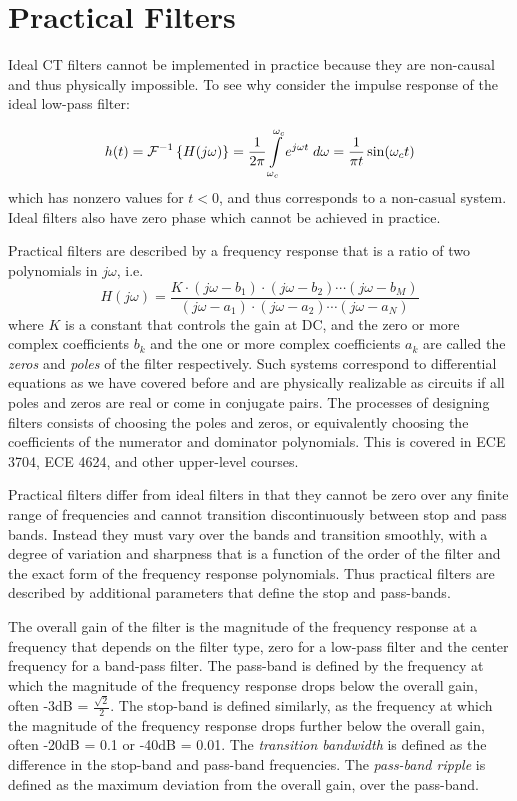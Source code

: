 \section{Practical Filters}

Ideal CT filters cannot be implemented in practice because they are non-causal and thus physically impossible. To see why consider the impulse response of the ideal low-pass filter:

\[
h(t) = \mathcal{F}^{-1} \left\{ H(j\omega) \right\} = \frac{1}{2\pi} \int\limits_{\-\omega_c}^{\omega_c} e^{j\omega t} \; d\omega = \frac{1}{\pi t}\sin(\omega_c t) 
\]
which has nonzero values for $t < 0$, and thus corresponds to a non-casual system. Ideal filters also have zero phase which cannot be achieved in practice.

Practical filters are described by a frequency response that is a ratio of two polynomials in $j\omega$, i.e.
\[
H(j\omega) = \frac{K \cdot(j\omega - b_1)\cdot(j\omega - b_2)\cdots (j\omega - b_M)}{(j\omega - a_1)\cdot(j\omega - a_2)\cdots (j\omega - a_N)}
\]
where $K$ is a constant that controls the gain at DC, and the zero or more complex coefficients $b_k$ and the one or more complex coefficients $a_k$ are called the \emph{zeros} and \emph{poles} of the filter respectively. Such systems correspond to differential equations as we have covered before and are physically realizable as circuits if all poles and zeros are real or come in conjugate pairs. The processes of designing filters consists of choosing the poles and zeros, or equivalently choosing the coefficients of the numerator and dominator polynomials. This is covered in ECE 3704, ECE 4624, and other upper-level courses. 

Practical filters differ from ideal filters in that they cannot be zero over any finite range of frequencies and cannot transition discontinuously between stop and pass bands. Instead they must vary over the bands and transition smoothly, with a degree of variation and sharpness that is a function of the order of the filter and the exact form of the frequency response polynomials. Thus practical filters are described by additional parameters that define the stop and pass-bands.

The overall gain of the filter is the magnitude of the frequency response at a frequency that depends on the filter type, zero for a low-pass filter and the center frequency for a band-pass filter. The pass-band is defined by the frequency at which the magnitude of the frequency response drops below the overall gain, often -3dB = $\frac{\sqrt{2}}{2}$. The stop-band is defined similarly, as the frequency at which the magnitude of the frequency response drops further below the overall gain, often -20dB = 0.1 or -40dB = 0.01. The \emph{transition bandwidth} is defined as the difference in the stop-band and pass-band frequencies. The \emph{pass-band ripple} is defined as the maximum deviation from the overall gain, over the pass-band.


